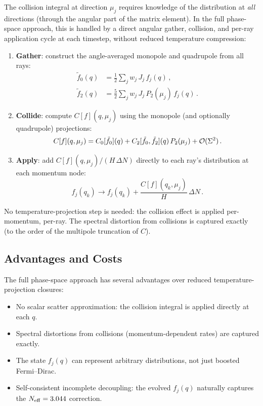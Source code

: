 The collision integral at direction $\mu_j$ requires knowledge of the distribution at \emph{all} directions (through the angular part of the matrix element).  In the full phase-space approach, this is handled by a direct angular gather, collision, and per-ray application cycle at each timestep, without reduced temperature compression:

\begin{enumerate}
\item \textbf{Gather}: construct the angle-averaged monopole and quadrupole from all rays:
\begin{align}
\tilde{f}_0(q) &= \frac{1}{2}\sum_j w_j\,J_j\,f_j(q)\,,\\
\tilde{f}_2(q) &= \frac{5}{2}\sum_j w_j\,J_j\,P_2(\mu_j)\,f_j(q)\,.
\end{align}

\item \textbf{Collide}: compute $C[f](q, \mu_j)$ using the monopole (and optionally quadrupole) projections:
\begin{equation}
C[f](q, \mu_j) = C_0[\tilde{f}_0](q) + C_2[\tilde{f}_0, \tilde{f}_2](q)\,P_2(\mu_j) + \mathcal{O}(\Sigma^2)\,.
\end{equation}

\item \textbf{Apply}: add $C[f](q, \mu_j)/(H\,\Delta N)$ directly to each ray's distribution at each momentum node:
\begin{equation}
f_j(q_k) \to f_j(q_k) + \frac{C[f](q_k, \mu_j)}{H}\,\Delta N\,.
\end{equation}
\end{enumerate}

No temperature-projection step is needed: the collision effect is applied per-momentum, per-ray.  The spectral distortion from collisions is captured exactly (to the order of the multipole truncation of $C$).
\subsection{Advantages and Costs}

The full phase-space approach has several advantages over reduced temperature-projection closures:
\begin{itemize}
\item No scalar scatter approximation: the collision integral is applied directly at each $q$.
\item Spectral distortions from collisions (momentum-dependent rates) are captured exactly.
\item The state $f_j(q)$ can represent arbitrary distributions, not just boosted Fermi--Dirac.
\item Self-consistent incomplete decoupling: the evolved $f_j(q)$ naturally captures the $N_{\rm eff} = 3.044$ correction.
\end{itemize}


